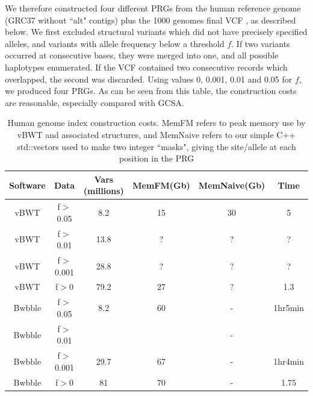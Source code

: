 \documentclass[runningheads,a4paper]{llncs}
\begin{document}
We therefore constructed four different PRGs from the human reference genome (GRC37 without ``alt" contigs) plus the 1000 genomes final VCF \cite{1000g}, as described below. We first  excluded structural variants which did not have precisely specified alleles, and variants with allele frequency below a threshold $f$. If two variants occurred at consecutive bases, they were merged into one, and all possible haplotypes enumerated. If the VCF contained two consecutive records which overlapped, the second was discarded. Using values 0, 0.001, 0.01 and 0.05 for $f$, we produced four PRGs. As can be seen from this table, the construction costs are reasonable, especially compared with GCSA.

\begin{table}
\caption{Human genome index construction costs. MemFM refers to peak memory use by vBWT and associated structures, and MemNaive refers to our simple C++ std::vectors used to make two integer ``masks", giving the site/allele at each position in the PRG} 
\centering
\begin{tabular}{c c c c c c}
\hline
Software & Data & Vars (millions) & MemFM(Gb) & MemNaive(Gb) & Time\\
\hline
vBWT & f$>$0.05  & 8.2 &15 &  30 & 5 \\
vBWT & f$>$0.01  & 13.8  & ? & ? & ? \\
vBWT & f$>$0.001& 28.8 & ? & ? & ? \\
vBWT & f$>$0   & 79.2 & 27 & ? & 1.3 \\
\hline
Bwbble & f$>$0.05 & 8.2 & 60 & - & 1hr5min \\ 
Bwbble & f$>$0.01 &  & & - &  \\ 
Bwbble & f$>$0.001 & 29.7 & 67 & - & 1hr4min \\ 
Bwbble & f$>$0 & 81 & 70 & - & 1.75 \\ 
\hline
\end{tabular}
\end{table}
\end{document}
